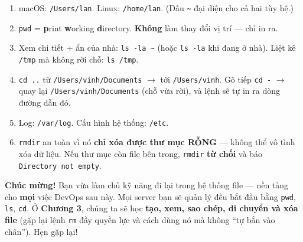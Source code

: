 \documentclass[12pt,a4paper]{article}
\newcommand{\hm}{\textasciitilde{}}
\begin{document}
\begin{enumerate}[leftmargin=*]
  \item macOS: \texttt{/Users/lan}. Linux: \texttt{/home/lan}. (Dấu \texttt{\hm} đại diện cho cả hai tùy hệ.)
  \item \texttt{pwd} = \textbf{p}rint \textbf{w}orking \textbf{d}irectory. \textbf{Không} làm thay đổi vị trí --- chỉ in ra.
  \item Xem chi tiết + ẩn của nhà: \texttt{ls -la \hm} (hoặc \texttt{ls -la} khi đang ở nhà). Liệt kê \texttt{/tmp} mà không rời chỗ: \texttt{ls /tmp}.
  \item \texttt{cd ..} từ \texttt{/Users/vinh/Documents} $\rightarrow$ tới \texttt{/Users/vinh}. Gõ tiếp \texttt{cd -} $\rightarrow$ quay lại \texttt{/Users/vinh/Documents} (chỗ vừa rời), và lệnh sẽ tự in ra dòng đường dẫn đó.
  \item Log: \texttt{/var/log}. Cấu hình hệ thống: \texttt{/etc}.
  \item \texttt{rmdir} an toàn vì nó \textbf{chỉ xóa được thư mục RỖNG} --- không thể vô tình xóa dữ liệu. Nếu thư mục còn file bên trong, \texttt{rmdir} \textbf{từ chối} và báo \texttt{Directory not empty}.
\end{enumerate}

\vspace{1em}
\begin{tcolorbox}[colback=labback, colframe=labcolor, boxrule=0.8pt, arc=2pt]
\textbf{Chúc mừng!} Bạn vừa làm chủ kỹ năng đi lại trong hệ thống file --- nền tảng cho \textbf{mọi} việc DevOps sau này. Mọi server bạn sẽ quản lý đều bắt đầu bằng \texttt{pwd}, \texttt{ls}, \texttt{cd}. Ở \textbf{Chương 3}, chúng ta sẽ học \textbf{tạo, xem, sao chép, di chuyển và xóa file} (gặp lại lệnh \texttt{rm} đầy quyền lực và cách dùng nó mà không ``tự bắn vào chân''). Hẹn gặp lại!
\end{tcolorbox}
\end{document}
